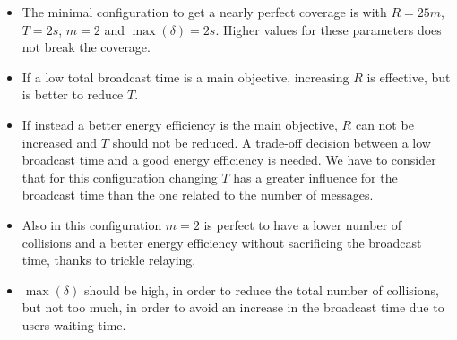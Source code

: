 \begin{itemize}
	\item The minimal configuration to get a nearly perfect coverage is with
		\(R\!=\!25m\), \(T\!=\!2s\), \(m\!=\!2\) and
		\(\max(\delta)\!=\!2s\). Higher values for these parameters does
		not break the coverage.
	\item If a low total broadcast time is a main objective, increasing
		\(R\) is effective, but is better to reduce \(T\).
	\item If instead a better energy efficiency is the main objective, \(R\)
		can not be increased and \(T\) should not be reduced. A
		trade-off decision between a low broadcast time and a good
		energy efficiency is needed. We have to consider that for this
		configuration changing \(T\) has a greater influence for the
		broadcast time than the one related to the number of messages.
	\item Also in this configuration \(m\!=\!2\) is perfect to have a lower
		number of collisions and a better energy efficiency without
		sacrificing the broadcast time, thanks to trickle relaying.
	\item \(\max(\delta)\) should be high, in order to reduce the total
		number of collisions, but not too much, in order to avoid an
		increase in the broadcast time due to users waiting time.
\end{itemize}
